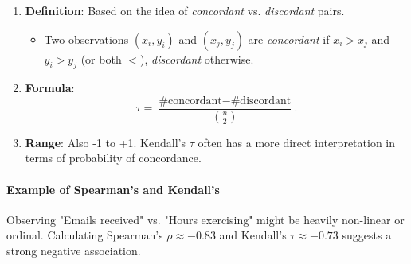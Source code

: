 \documentclass[10pt, total={6in, 8in}]{extarticle}
\begin{document}
\begin{enumerate}
    \item \textbf{Definition}: Based on the idea of \emph{concordant} vs. \emph{discordant} pairs.
          \begin{itemize}
              \item Two observations $(x_i, y_i)$ and $(x_j, y_j)$ are \emph{concordant} if $x_i > x_j$ and $y_i > y_j$ (or both $<$), \emph{discordant} otherwise.
          \end{itemize}
    \item \textbf{Formula}:
          \[
              \tau
              = \frac{\text{\#concordant} - \text{\#discordant}}{\binom{n}{2}}.
          \]
    \item \textbf{Range}: Also -1 to +1. Kendall's $\tau$ often has a more direct interpretation in terms of probability of concordance.
\end{enumerate}

\paragraph{Example of Spearman's and Kendall's} Observing "Emails received" vs. "Hours exercising" might be heavily non-linear or ordinal. Calculating Spearman's $\rho \approx -0.83$ and Kendall's $\tau \approx -0.73$ suggests a strong negative association.
\end{document}
